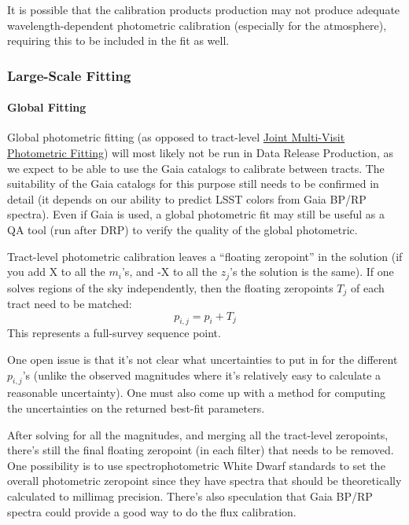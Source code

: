 It is possible that the calibration products production may not produce adequate wavelength-dependent photometric calibration (especially for the atmosphere), requiring this to be included in the fit as well.

\subsubsection{Large-Scale Fitting}

\paragraph{Global Fitting}
\label{sec:acGlobalPhotometricFit}

Global photometric fitting (as opposed to tract-level \hyperref[sec:acJointPhotometricFit]{Joint Multi-Visit Photometric Fitting}) will most likely not be run in Data Release Production, as we expect to be able to use the Gaia catalogs to calibrate between tracts.  The suitability of the Gaia catalogs for this purpose still needs to be confirmed in detail (it depends on our ability to predict LSST colors from Gaia BP/RP spectra).  Even if Gaia is used, a global photometric fit may still be useful as a QA tool (run after DRP) to verify the quality of the global photometric.

Tract-level photometric calibration leaves a ``floating zeropoint'' in the solution (if you add X to all the $m_i$'s, and -X to all the $z_j$'s the solution is the same).  If one solves regions of the sky independently, then the floating zeropoints $T_j$ of each tract need to be matched:
\begin{equation}
p_{i,j} = p_i + T_j
\end{equation}
This represents a full-survey sequence point.

One open issue is that it's not clear what uncertainties to put in for the different $p_{i,j}$'s (unlike the observed magnitudes where it's relatively easy to calculate a reasonable uncertainty). One must also come up with a method for computing the uncertainties on the returned best-fit parameters.

After solving for all the magnitudes, and merging all the tract-level zeropoints, there's still the final floating zeropoint (in each filter) that needs to be removed.  One possibility is to use spectrophotometric White Dwarf standards to set the overall photometric zeropoint since they have spectra that should be theoretically calculated to millimag precision.  There's also speculation that Gaia BP/RP spectra could provide a good way to do the flux calibration.

